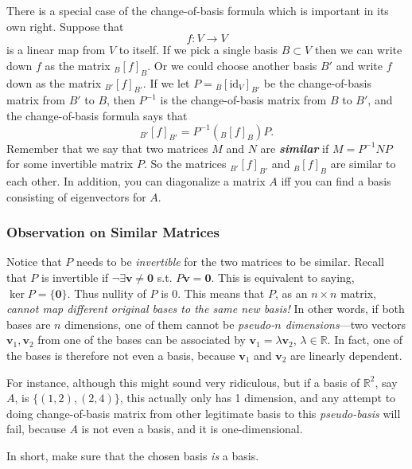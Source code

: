 \documentclass[12pt]{report}
\theoremstyle{definition}
\begin{document}
There is a special case of the change-of-basis formula which is important in its
own right. Suppose that\[
    f:V\rightarrow V
\]is a linear map from $V$ to itself. If we pick a single basis $B\subset V$
then we can write down $f$ as the matrix ${}_B{[f]}_{B}$.
Or we could choose another basis $B'$ and write $f$ down as the matrix
${}_{B'}{[f]}_{B'}$. If we let $P={}_B{[\text{id}_V]}_{B'}$ be the
change-of-basis matrix from $B'$ to $B$, then $P^{-1}$ is the change-of-basis 
matrix from $B$ to $B'$, and the change-of-basis formula says that\[
    {}_{B'}{[f]}_{B'} = P^{-1}\left({}_B{[f]}_{B}\right)P.
\]
Remember that we say that two matrices $M$ and $N$ are \textbf{\emph{similar}}
if $M = P^{-1}NP$ for some invertible matrix $P$. So the matrices
${}_{B'}{[f]}_{B'}$ and ${}_B{[f]}_{B}$ are similar to each other.
In addition, you can diagonalize a matrix $A$ iff you can find a basis consisting
of eigenvectors for $A$.

\subsubsection{Observation on Similar Matrices}

Notice that $P$ needs to be \emph{invertible} for the two matrices to be
similar. Recall that $P$ is invertible if $\neg\exists \mathbf{v}\neq\mathbf{0}$
s.t. $P\mathbf{v}=\mathbf{0}$.
This is equivalent to saying, $\ker{P} = \{\mathbf{0}\}$.
Thus nullity of $P$ is 0. 
This means that $P$, as an $n\times n$ matrix,
\emph{cannot map different original bases to the same new basis!}
In other words, if both bases are $n$ dimensions, one of them cannot be
\emph{pseudo-$n$ dimensions}---two vectors $\mathbf{v}_1, \mathbf{v}_2$
from one of the bases can be associated by $\mathbf{v}_1 = \lambda\mathbf{v}_2$,
$\lambda\in\mathbb{R}$.
In fact, one of the bases is therefore not even a basis,
because $\mathbf{v}_1$ and $\mathbf{v}_2$ are linearly dependent.

\medskip
\noindent For instance, although this might sound very ridiculous, but if a basis of
$\mathbb{R}^{2}$, say $A$, is $\{(1, 2), (2, 4)\}$,
this actually only has 1 dimension,
and any attempt to doing change-of-basis matrix from other legitimate basis 
to this \emph{pseudo-basis} will fail, because $A$ is not even a basis, and it
is one-dimensional.

\medskip
\noindent In short, make sure that the chosen basis \emph{is} a basis.
\end{document}
